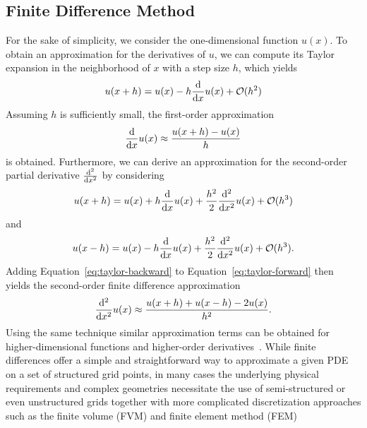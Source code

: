 \subsection{Finite Difference Method}
For the sake of simplicity, we consider the one-dimensional function $u(x)$.
To obtain an approximation for the derivatives of $u$, we can compute its Taylor expansion in the neighborhood of $x$ with a step size $h$, which yields
\begin{equation}
	u(x + h) = u(x) - h \dv{x} u(x) + \mathcal{O}(h^2)
\end{equation}
Assuming $h$ is sufficiently small, the first-order approximation 
\begin{equation}
	\dv{x} u(x) \approx \frac{u(x + h) -  u(x)}{h}
\end{equation}
is obtained.
Furthermore, we can derive an approximation for the second-order partial derivative $\dv[2]{x}$ by considering
\begin{equation}
	u(x + h) = u(x) + h \dv{x} u(x) + \frac{h^2}{2} \dv[2]{x} u(x) + \mathcal{O}(h^3)
	\label{eq:taylor-forward}
\end{equation}
and 
\begin{equation}
	u(x - h) = u(x) - h \dv{x} u(x) + \frac{h^2}{2} \dv[2]{x} u(x) + \mathcal{O}(h^3).
	\label{eq:taylor-backward}
\end{equation}
Adding Equation~\eqref{eq:taylor-backward} to Equation~\eqref{eq:taylor-forward} then yields the second-order finite difference approximation
\begin{equation}
	 \dv[2]{x} u(x) \approx \frac{u(x + h) + u(x - h) - 2u(x)}{h^2}.
\end{equation}
Using the same technique similar approximation terms can be obtained for higher-dimensional functions and higher-order derivatives~\cite{strikwerda2004finite}.
While finite differences offer a simple and straightforward way to approximate a given PDE on a set of structured grid points, in many cases the underlying physical requirements and complex geometries necessitate the use of semi-structured or even unstructured grids together with more complicated discretization approaches such as the finite volume (FVM) and finite element method (FEM)~\cite{versteeg2007introduction,zienkiewicz2005finite}
